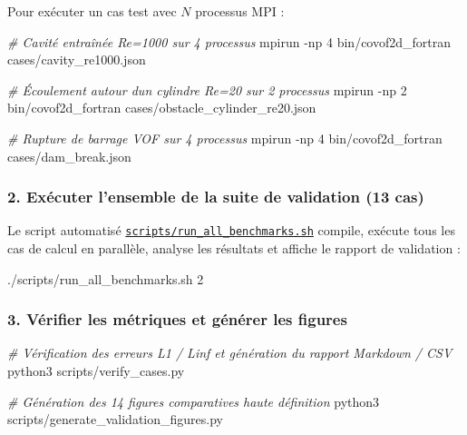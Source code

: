 \documentclass[
  french,
]{article}
\newenvironment{Shaded}{}{}
\newcommand{\AttributeTok}[1]{\textcolor[rgb]{0.49,0.56,0.16}{#1}}
\newcommand{\CommentTok}[1]{\textcolor[rgb]{0.38,0.63,0.69}{\textit{#1}}}
\newcommand{\ExtensionTok}[1]{#1}
\newcommand{\NormalTok}[1]{#1}
\begin{document}
Pour exécuter un cas test avec \(N\) processus MPI :

\begin{Shaded}
\begin{Highlighting}[]
\CommentTok{\# Cavité entraînée Re=1000 sur 4 processus}
\ExtensionTok{mpirun} \AttributeTok{{-}np}\NormalTok{ 4 bin/covof2d\_fortran cases/cavity\_re1000.json}

\CommentTok{\# Écoulement autour d\textquotesingle{}un cylindre Re=20 sur 2 processus}
\ExtensionTok{mpirun} \AttributeTok{{-}np}\NormalTok{ 2 bin/covof2d\_fortran cases/obstacle\_cylinder\_re20.json}

\CommentTok{\# Rupture de barrage VOF sur 4 processus}
\ExtensionTok{mpirun} \AttributeTok{{-}np}\NormalTok{ 4 bin/covof2d\_fortran cases/dam\_break.json}
\end{Highlighting}
\end{Shaded}

\subsubsection{2. Exécuter l'ensemble de la suite de validation (13
cas)}\label{exuxe9cuter-lensemble-de-la-suite-de-validation-13-cas}

Le script automatisé
\href{scripts/run_all_benchmarks.sh}{\texttt{scripts/run\_all\_benchmarks.sh}}
compile, exécute tous les cas de calcul en parallèle, analyse les
résultats et affiche le rapport de validation :

\begin{Shaded}
\begin{Highlighting}[]
\ExtensionTok{./scripts/run\_all\_benchmarks.sh}\NormalTok{ 2}
\end{Highlighting}
\end{Shaded}

\subsubsection{3. Vérifier les métriques et générer les
figures}\label{vuxe9rifier-les-muxe9triques-et-guxe9nuxe9rer-les-figures}

\begin{Shaded}
\begin{Highlighting}[]
\CommentTok{\# Vérification des erreurs L1 / Linf et génération du rapport Markdown / CSV}
\ExtensionTok{python3}\NormalTok{ scripts/verify\_cases.py}

\CommentTok{\# Génération des 14 figures comparatives haute définition}
\ExtensionTok{python3}\NormalTok{ scripts/generate\_validation\_figures.py}
\end{Highlighting}
\end{Shaded}
\end{document}
